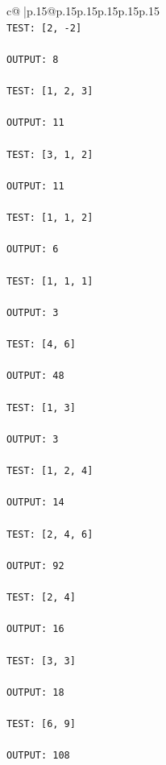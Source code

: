 \documentclass{article}
\begin{document}
{\begin{supertabular}{c@{$\;$}|p{.15\linewidth}@{}p{.15\linewidth}p{.15\linewidth}p{.15\linewidth}p{.15\linewidth}p{.15\linewidth}}
{{{\\ 
\texttt{TEST: {[}2, {-}2{]}} \\
\\ 
\texttt{OUTPUT: 8} \\
\\ 
\texttt{TEST: {[}1, 2, 3{]}} \\
\\ 
\texttt{OUTPUT: 11} \\
\\ 
\texttt{TEST: {[}3, 1, 2{]}} \\
\\ 
\texttt{OUTPUT: 11} \\
\\ 
\texttt{TEST: {[}1, 1, 2{]}} \\
\\ 
\texttt{OUTPUT: 6} \\
\\ 
\texttt{TEST: {[}1, 1, 1{]}} \\
\\ 
\texttt{OUTPUT: 3} \\
\\ 
\texttt{TEST: {[}4, 6{]}} \\
\\ 
\texttt{OUTPUT: 48} \\
\\ 
\texttt{TEST: {[}1, 3{]}} \\
\\ 
\texttt{OUTPUT: 3} \\
\\ 
\texttt{TEST: {[}1, 2, 4{]}} \\
\\ 
\texttt{OUTPUT: 14} \\
\\ 
\texttt{TEST: {[}2, 4, 6{]}} \\
\\ 
\texttt{OUTPUT: 92} \\
\\ 
\texttt{TEST: {[}2, 4{]}} \\
\\ 
\texttt{OUTPUT: 16} \\
\\ 
\texttt{TEST: {[}3, 3{]}} \\
\\ 
\texttt{OUTPUT: 18} \\
\\ 
\texttt{TEST: {[}6, 9{]}} \\
\\ 
\texttt{OUTPUT: 108} \\
}}}
\end{supertabular}}
\end{document}
